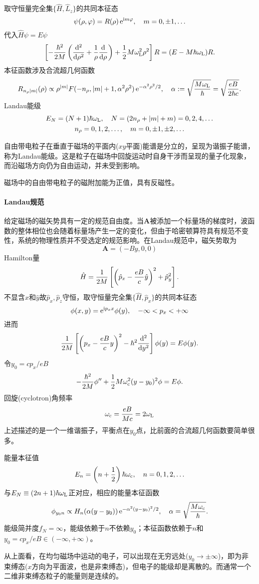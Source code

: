 取守恒量完全集$\{\hat H,\hat L_z\}$的共同本征态 %
\[
	\psi(\rho,\varphi)=R(\rho)\e{\i m\varphi},\quad m=0,\pm 1,\ldots
\]
代入$\hat H\psi=E\psi$
\[
	\fkh{-\frac{\hbar^2}{2M}\kh{\dd[2]\rho+\frac1\rho\dd\rho}+\frac12M\omega_\Larmor^2\rho^2}R=(E-M\hbar\omega_\Larmor)R.
\]
本征函数涉及合流超几何函数
\[
R_{n_\rho\abs m}(\rho)\propto\rho^{\abs m}F(-n_\rho,\abs m+1,\alpha^2\rho^2)\e{-\alpha^2\rho^2/2},\quad \alpha:=\sqrt{\frac{M\omega_\Larmor}\hbar}=\sqrt{\frac{eB}{2\hbar  c}}.
\]
Landau能级
\begin{gather*}
	E_N=(N+1)\hbar\omega_\Larmor,\quad N=(2n_\rho+\abs m+m)=0,2,4,\ldots\\
	n_\rho=0,1,2,\ldots,\quad m=0,\pm 1,\pm 2,\ldots
\end{gather*}

自由带电粒子在垂直于磁场的平面内($xy$平面)能谱是分立的，呈现为谐振子能谱，称为Landau能级。这是粒子在磁场中回旋运动时自身干涉而呈现的量子化现象，而沿磁场方向仍为自由运动，并未受到影响。

磁场中的自由带电粒子的磁附加能为正值，具有反磁性。
\paragraph{Landau规范}给定磁场的磁矢势具有一定的规范自由度。当$\bm A$被添加一个标量场的梯度时，波函数的整体相位也会随着标量场产生一定的变化，但由于哈密顿算符具有规范不变性，系统的物理性质并不受选定的规范影响。在Landau规范中，磁矢势取为
\[
	\bm A=(-By,0,0)
\]
Hamilton量
\[
	\hat H=\frac1{2M}\fkh{\kh{\hat p_x-\frac{eB}c\hat y}^2+\hat p_y^2}.
\]
不显含$\hat x$和$\hat y$故$\hat p_x,\hat p_z$守恒，取守恒量完全集$\{\hat H,\hat p_x\}$的共同本征态
\[
	\phi(x,y)=\e{\i p_xx}\phi(y),\quad-\infty<p_x<+\infty
\]
进而
\[
	\frac1{2M}\fkh{\kh{p_x-\frac{eB}cy}^2-\hbar^2\dd[2]y}\phi(y)=E\phi(y).
\]
令$y_0=cp_x/eB$
\[
	-\frac{\hbar^2}{2M}\phi''+\frac12M\omega_\cyc^2(y-y_0)^2\phi=E\phi.
\]
回旋(cyclotron)角频率
\[
	\omega_\cyc=\frac{eB}{Mc}=2\omega_\Larmor
\]
上述描述的是一个一维谐振子，平衡点在$y_0$点，比前面的合流超几何函数要简单很多。

能量本征值
\[
E_n=\kh{n+\frac12}\hbar\omega_\cyc,\quad n=0,1,2,\ldots
\]
与$E_N\equiv(2n+1)\hbar\omega_\Larmor$正对应，相应的能量本征函数
\[
	\phi_{y_0n}\propto H_n(\alpha(y-y_0))\e{-\alpha^2(y-y_0)^2/2},\quad\alpha=\sqrt{\frac{M\omega_\cyc}\hbar}.
\]
能级简并度$f_N=\infty$，能级依赖于$n$不依赖$y_0$；本征函数依赖于$n$和$y_0=cp_x/eB\in(-\infty,+\infty)$。

从上面看，在均匀磁场中运动的电子，可以出现在无穷远处($y_0\to\pm\infty$)，即为非束缚态($x$方向为平面波，也是非束缚态)，但电子的能级却是离散的。而通常一个二维非束缚态粒子的能量则是连续的。
